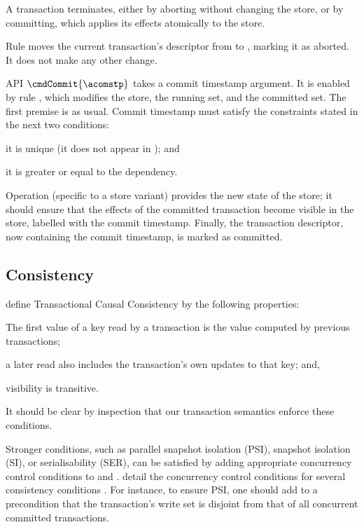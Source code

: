 A transaction terminates, either by aborting without changing the store,
or by committing, which applies its effects atomically to the store.

Rule \abortrule{} moves the current transaction's descriptor
from \atrsetr{} to \atrseta{}, marking it as aborted.
It does not make any other change.

API $\cmdCommit{\acomstp}$ takes a commit timestamp argument.
It is enabled by rule \commitrule{}, which modifies the store, the
running set, and the committed set.
The first premise is as usual.
Commit timestamp \acomstp{} must
satisfy the constraints stated in the next two conditions:
\begin{inparablank}
\item
  it is unique (it does not appear in \atrsetc{});
and
\item
  it is greater or equal to the dependency.
\end{inparablank}
Operation \doCommit{} (specific to a store
variant) provides the new state of the store; it should ensure that the
effects of the committed transaction become visible in the store,
labelled with the commit timestamp.
Finally, the transaction descriptor, now containing the commit
timestamp, is marked as committed.

\subsection{Consistency}

\citet{formel:db:rep:1856} define Transactional Causal
Consistency by the following properties:
\begin{inparaenum}
\item
  The first value of a key read by a transaction is the value computed by
  previous transactions;
\item
  a later read also includes the transaction's own updates to that key;
  and, 
\item
  visibility is transitive.
\end{inparaenum}
It should be clear by inspection that our transaction semantics enforce
these conditions.

Stronger conditions, such as parallel snapshot isolation (PSI), snapshot
isolation (SI), or serialisability (SER), can be satisfied by adding
appropriate concurrency control conditions to \starttxnrule{} and
\commitrule{}.
\citeauthor{formel:db:rep:1856} detail the concurrency control
conditions for several consistency conditions \cite[Figure
5]{formel:db:rep:1856}.
For instance, to ensure PSI, one should add to \commitrule{} a
precondition that the transaction's write set is disjoint from that of
all concurrent committed transactions.

